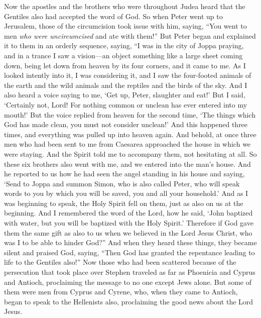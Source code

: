 \begin{biblechapter} %
 Now the apostles and the brothers who were throughout Judea heard that the Gentiles also had accepted the word of God.
\verse So when Peter went up to Jerusalem, those of the circumcision took issue with him,
\verse saying, “You went to men \textit{who were uncircumcised} and ate with them!”
\verse But Peter began and explained it to them in an orderly sequence, saying,
\verse “I was in the city of Joppa praying, and in a trance I saw a vision—an object something like a large sheet coming down, being let down from heaven by its four corners, and it came to me.
\verse As I looked intently into it, I was considering it, and I saw the four-footed animals of the earth and the wild animals and the reptiles and the birds of the sky.
\verse And I also heard a voice saying to me, ‘Get up, Peter, slaughter and eat!’
\verse But I said, ‘Certainly not, Lord! For nothing common or unclean has ever entered into my mouth!’
\verse But the voice replied from heaven for the second time, ‘The things which God has made clean, you must not consider unclean!’
\verse And this happened three times, and everything was pulled up into heaven again.
\verse And behold, at once three men who had been sent to me from Caesarea approached the house in which we were staying.
\verse And the Spirit told me to accompany them, not hesitating at all. So these six brothers also went with me, and we entered into the man’s house.
\verse And he reported to us how he had seen the angel standing in his house and saying, ‘Send to Joppa and summon Simon, who is also called Peter,
\verse who will speak words to you by which you will be saved, you and all your household.’
\verse And as I was beginning to speak, the Holy Spirit fell on them, just as also on us at the beginning.
\verse And I remembered the word of the Lord, how he said, ‘John baptized with water, but you will be baptized with the Holy Spirit.’
\verse Therefore if God gave them the same gift as also to us when we believed in the Lord Jesus Christ, who was I to be able to hinder God?”
\verse And when they heard these things, they became silent and praised God, saying, “Then God has granted the repentance leading to life to the Gentiles also!”
 Now those who had been scattered because of the persecution that took place over Stephen traveled as far as Phoenicia and Cyprus and Antioch, proclaiming the message to no one except Jews alone.
\verse But some of them were men from Cyprus and Cyrene, who, when they came to Antioch, began to speak to the Hellenists also, proclaiming the good news about the Lord Jesus.

\end{biblechapter}
